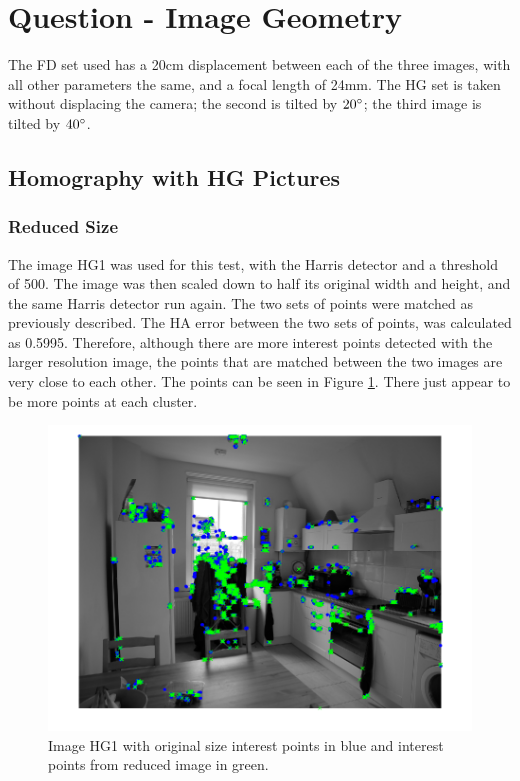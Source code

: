 \documentclass[a4paper, 10pt, conference]{ieeeconf}
\begin{document}
\section{Question - Image Geometry}
The FD set used has a 20cm displacement between each of the three images, with all other parameters the same, and a focal length of 24mm. The HG set is taken without displacing the camera; the second is tilted by $20\degree$; the third image is tilted by $40\degree$.

\subsection{Homography with HG Pictures}
\subsubsection{Reduced Size}
The image HG1 was used for this test, with the Harris detector and a threshold of 500. The image was then scaled down to half its original width and height, and the same Harris detector run again. The two sets of points were matched as previously described. The HA error between the two sets of points, was calculated as 0.5995. Therefore, although there are more interest points detected with the larger resolution image, the points that are matched between the two images are very close to each other. The points can be seen in Figure \ref{fig:reducedcompare}. There just appear to be more points at each cluster.

\begin{figure}[!ht]
  \centering
  \includegraphics[width=0.75\linewidth]{pic/q2_1_a_imgBoth}
  \caption{Image HG1 with original size interest points in blue and interest points from reduced image in green.}\vspace{-.5cm}
  \label{fig:reducedcompare}
\end{figure}
\end{document}

